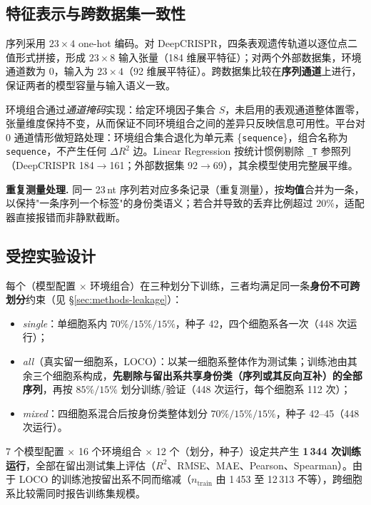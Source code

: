\subsection{特征表示与跨数据集一致性}
\label{sec:methods-features}

序列采用 $23\times4$ one-hot 编码。对 DeepCRISPR，四条表观遗传轨道以逐位点二值形式拼接，形成 $23\times8$ 输入张量（184 维展平特征）；对两个外部数据集，环境通道数为 0，输入为 $23\times4$（92 维展平特征）。跨数据集比较在\textbf{序列通道}上进行，保证两者的模型容量与输入语义一致。

环境组合通过\emph{通道掩码}实现：给定环境因子集合 $S$，未启用的表观通道整体置零，张量维度保持不变，从而保证不同环境组合之间的差异只反映信息可用性。平台对 0 通道情形做短路处理：环境组合集合退化为单元素 \{\texttt{sequence}\}，组合名称为 \texttt{sequence}，不产生任何 $\Delta R^{2}$ 边。Linear Regression 按统计惯例剔除 \texttt{\_T} 参照列（DeepCRISPR 184$\to$161；外部数据集 92$\to$69），其余模型使用完整展平维。

\textbf{重复测量处理.} 同一 23\,nt 序列若对应多条记录（重复测量），按\textbf{均值}合并为一条，以保持"一条序列一个标签"的身份类语义；若合并导致的丢弃比例超过 $20\%$，适配器直接报错而非静默截断。

\subsection{受控实验设计}
\label{sec:methods-design}

每个（模型配置 $\times$ 环境组合）在三种划分下训练，三者均满足同一条\textbf{身份不可跨划分}约束（见 \S\ref{sec:methods-leakage}）：

\begin{itemize}
\item \emph{single}：单细胞系内 $70\%/15\%/15\%$，种子 42，四个细胞系各一次（448 次运行）；
\item \emph{all}（真实留一细胞系，LOCO）：以某一细胞系整体作为测试集；训练池由其余三个细胞系构成，\textbf{先剔除与留出系共享身份类（序列或其反向互补）的全部序列}，再按 $85\%/15\%$ 划分训练/验证（448 次运行，每个细胞系 112 次）；
\item \emph{mixed}：四细胞系混合后按身份类整体划分 $70\%/15\%/15\%$，种子 42--45（448 次运行）。
\end{itemize}

7 个模型配置 $\times$ 16 个环境组合 $\times$ 12 个（划分，种子）设定共产生 \textbf{1\,344 次训练运行}，全部在留出测试集上评估（$R^{2}$、RMSE、MAE、Pearson、Spearman）。由于 LOCO 的训练池按留出系不同而缩减（$n_{\text{train}}$ 由 1\,453 至 12\,313 不等），跨细胞系比较需同时报告训练集规模。

